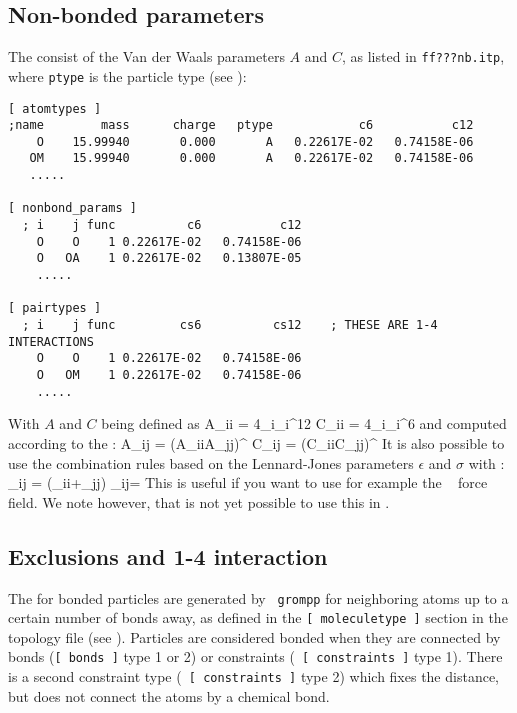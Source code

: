 \subsection{Non-bonded parameters}
\label{subsec:nbpar}
The  consist of the Van der Waals parameters
$A$ and $C$, as listed in {\tt ff???nb.itp}, where {\tt ptype} is the
particle type (see ):
{\small\begin{verbatim}
[ atomtypes ]
;name        mass      charge   ptype            c6           c12
    O    15.99940       0.000       A   0.22617E-02   0.74158E-06
   OM    15.99940       0.000       A   0.22617E-02   0.74158E-06
   .....

[ nonbond_params ]
  ; i    j func          c6           c12
    O    O    1 0.22617E-02   0.74158E-06
    O   OA    1 0.22617E-02   0.13807E-05
    .....

[ pairtypes ]
  ; i    j func         cs6          cs12    ; THESE ARE 1-4 INTERACTIONS
    O    O    1 0.22617E-02   0.74158E-06
    O   OM    1 0.22617E-02   0.74158E-06
    .....
\end{verbatim}}
With $A$ and $C$ being defined as
\beq
	A_{ii} = 4\epsilon_i\sigma_i^{12}
\eeq
\beq
	C_{ii} = 4\epsilon_i\sigma_i^{6}
\eeq
and computed according to the  :
\beq
	A_{ij} = (A_{ii}A_{jj})^{}
\eeq
\beq
	C_{ij} = (C_{ii}C_{jj})^{}
\eeq
It is also possible to use the combination rules based on the
Lennard-Jones parameters $\epsilon$ and $\sigma$ with : 
\beq
 	\sigma_{ij} = (\sigma_{ii}+\sigma_{jj})
\eeq
\beq
 	\epsilon_{ij}=
\eeq
This is useful if you want to use for example the
~\cite{Jorgensen88} force field.
We note however, that is not yet possible to use this in {\gromacs} {\gmxver}.

\subsection{Exclusions and 1-4 interaction}
\label{subsec:excl}
The  for bonded particles are generated by {\tt
grompp} for neighboring atoms up to a certain number of bonds away, as
defined in the {\tt [~moleculetype~]} section in the topology file
(see ). Particles are considered bonded when they are
connected by bonds ({\tt [~bonds~]} type 1 or 2) or constraints ({\tt
[~constraints~]} type 1). There is a second constraint type ({\tt
[~constraints~]} type 2) which fixes the distance, but does not connect
the atoms by a chemical bond.

